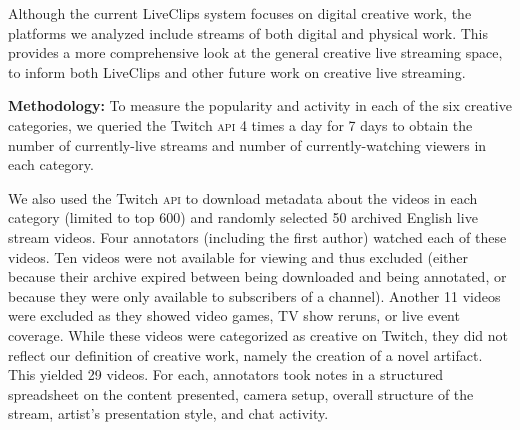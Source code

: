 Although the current LiveClips system focuses on digital creative work, the platforms we analyzed include streams of both digital and physical work. This provides a more comprehensive look at the general creative live streaming space, to inform both LiveClips and other future work on creative live streaming.

\textbf{Methodology:}
To measure the popularity and activity in each of the six creative categories, we queried the Twitch \textsc{api} 4 times a day for 7 days to obtain the number of currently-live streams and number of currently-watching viewers in each category.

We also used the Twitch \textsc{api} to download metadata about the videos in each category (limited to top 600)
and randomly selected 50 archived English live stream videos. Four annotators (including the first author) watched each of these videos. Ten videos were not available for viewing and thus excluded (either because their archive expired between being downloaded and being annotated, or because they were only available to subscribers of a channel). Another 11 videos were excluded as they showed video games, TV show reruns, or live event coverage. While these videos were categorized as creative on Twitch, they did not reflect our definition of creative work, namely the creation of a novel artifact. This yielded 29 videos. For each, annotators took notes in a structured spreadsheet on the content presented, camera setup, overall structure of the stream, artist's presentation style, and chat activity.

